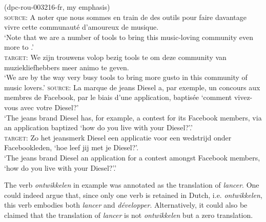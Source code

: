 \ea(dpc-rou-003216-fr, my emphasis)\label{ex:3:8}\\
\textsc{source:} A noter que nous sommes en train de  des outils pour faire davantage vivre cette communauté d'amoureux de musique.\\\relax
`Note that we are  a number of tools to bring this music-loving community even more to .'\smallskip\\
\textsc{target:} We zijn trouwens volop bezig tools te  om deze community van muziekliefhebbers meer animo te geven.\\\relax
`We are by the way very busy  tools to bring more gusto in this community of music lovers.'
\ex \label{ex:3:9}
\textsc{source:} La marque de jeans Diesel a, par exemple,  un concours aux membres de Facebook, par le biais d'une application, baptisée `comment vivez-vous avec votre Diesel?'\\\relax
`The jeans brand Diesel has, for example,  a contest for its Facebook members, via an application baptized ‘how do you live with your Diesel?'.'\smallskip\\
\textsc{target:} Zo  het jeansmerk Diesel een applicatie voor een wedstrijd onder Facebookleden, `hoe leef jij met je Diesel?'.\\\relax
`The jeans brand Diesel  an application for a contest amongst Facebook members, ‘how do you live with your Diesel?’.'
\z

The verb \textit{ontwikkelen} in example  was annotated as the translation of \textit{lancer}. One could indeed argue that, since only one verb is retained in Dutch, i.e. \textit{ontwikkelen}, this verb embodies both \textit{lancer} and \textit{développer}. Alternatively, it could also be claimed that the translation of \textit{lancer} is not \textit{ontwikkelen} but a zero translation.

